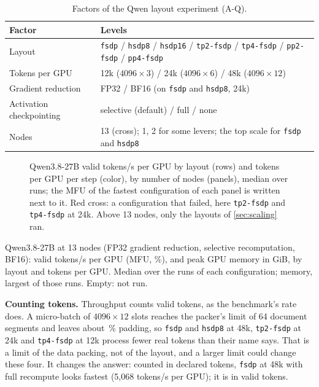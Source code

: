 \begin{table}[h]
  \caption{Factors of the Qwen layout experiment (A-Q).}
  \label{tab:aq}
  \centering\small
  \begin{adjustbox}{max width=\linewidth}
  \begin{tabular}{ll}
    \toprule
    Factor & Levels \\
    \midrule
    Layout & \texttt{fsdp} / \texttt{hsdp8} / \texttt{hsdp16} / \texttt{tp2-fsdp} / \texttt{tp4-fsdp} /
             \texttt{pp2-fsdp} / \texttt{pp4-fsdp} \\
    Tokens per GPU & 12k ($4096\times3$) / 24k ($4096\times6$) / 48k ($4096\times12$) \\
    Gradient reduction & FP32 / BF16 (on \texttt{fsdp} and \texttt{hsdp8}, 24k) \\
    Activation checkpointing & selective (default) / full / none \\
    Nodes & 13 (cross); 1, 2 for some levers; the top scale for \texttt{fsdp} and \texttt{hsdp8} \\
    \bottomrule
  \end{tabular}
  \end{adjustbox}
\end{table}

\begin{figure}[h]
  \centering{}
  \caption{Qwen3.8-27B valid tokens/s per GPU by layout (rows) and tokens per GPU per step (color), by number of nodes (panels), median over runs; the MFU of the fastest configuration of each panel is written next to it. Red cross: a configuration that failed, here \texttt{tp2-fsdp} and \texttt{tp4-fsdp} at 24k. Above 13 nodes, only the layouts of \cref{sec:scaling} ran. }
  \label{fig:qwen_layouts}
\end{figure}

\begin{table}[h]
  \caption{Qwen3.8-27B at 13 nodes (FP32 gradient reduction, selective recomputation, BF16): valid tokens/s per GPU (MFU, \%), and peak GPU memory in GiB, by layout and tokens per GPU. Median over the runs of each configuration; memory, largest of those runs. Empty: not run.}
  \label{tab:qwen_layouts}
  \centering\small
\end{table}

\textbf{Counting tokens.} Throughput counts valid tokens, as the benchmark's rate does. A micro-batch of $4096\times12$ slots reaches the packer's limit of 64 document segments and leaves about \TriPaddingPct\,\% padding, so \texttt{fsdp} and \texttt{hsdp8} at 48k, \texttt{tp2-fsdp} at 24k and \texttt{tp4-fsdp} at 12k process fewer real tokens than their name says. That is a limit of the data packing, not of the layout, and a larger limit could change these four. It changes the answer: counted in declared tokens, \texttt{fsdp} at 48k with full recompute looks fastest (5,068 tokens/s per GPU); it is \TriTokFortyEight{} in valid tokens.


